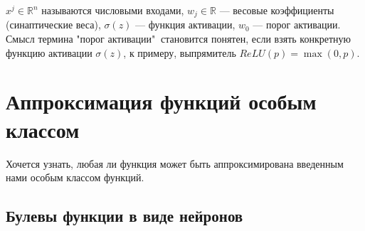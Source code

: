 \documentclass[specialist, 12pt, 
subf, %
href, colorlinks=true,
substylefile = spbu.rtx,
]{disser}
\begin{document}
$x^j \in \mathbb{R}^n$ называются числовыми входами, $w_j\in\mathbb{R}$ --- весовые коэффициенты (синаптические веса), $\sigma(z)$ --- функция активации, $w_0$ --- порог активации. Смысл термина "порог активации"$~$ становится понятен, если взять конкретную функцию активации $\sigma(z)$, к примеру, выпрямитель $ReLU(p) = \max (0,p)$.
	
	\section{Аппроксимация функций особым классом}
	
	Хочется узнать, любая ли функция может быть аппроксимирована введенным нами особым классом функций.
	
	\subsection{Булевы функции в виде нейронов}
	
\end{document}
